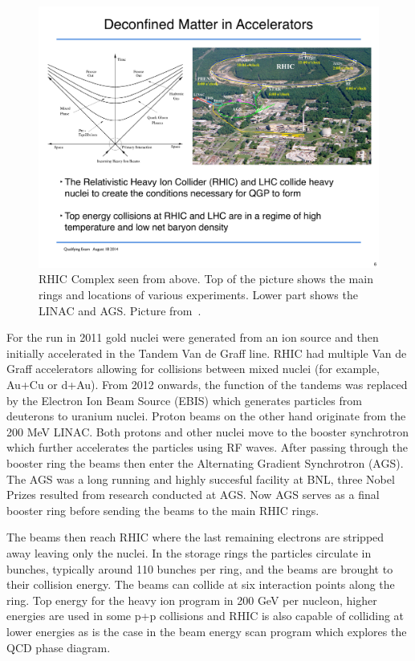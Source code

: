 \begin{figure}[htbp]
\begin{center}
\includegraphics[scale=0.75]{Plots/Detector/RHIC_Complex.pdf}
\end{center}
\caption[RHIC Facility]{RHIC Complex seen from above. Top of the picture shows the main rings and locations of various experiments. Lower part shows the LINAC and AGS. Picture from~\cite{RHICpic}.}
\label{fig:RHIC}
\end{figure}

For the run in 2011 gold nuclei were generated from an ion source and then initially accelerated in the Tandem Van de Graff line. RHIC had multiple Van de Graff accelerators allowing for collisions between mixed nuclei (for example, Au+Cu or d+Au). From 2012 onwards, the function of the tandems was replaced by the Electron Ion Beam Source (EBIS) which generates particles from deuterons to uranium nuclei. Proton beams on the other hand originate from the 200 MeV LINAC. Both protons and other nuclei move to the booster synchrotron which further accelerates the particles using RF waves. After passing through the booster ring the beams then enter the Alternating Gradient Synchrotron (AGS). The AGS was a long running and highly succesful facility at BNL, three Nobel Prizes resulted from research conducted at AGS. Now AGS serves as a final booster ring before sending the beams to the main RHIC rings. 

The beams then reach RHIC where the last remaining electrons are stripped away leaving only the nuclei. In the storage rings the particles circulate in bunches, typically around 110 bunches per ring, and the beams are brought to their collision energy. The beams can collide at six interaction points along the ring. Top energy for the heavy ion program in 200 GeV per nucleon, higher energies are used in some p+p collisions and RHIC is also capable of colliding at lower energies as is the case in the beam energy scan program which explores the QCD phase diagram.

